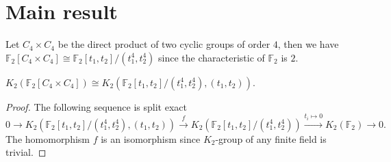 \section{Main result}
Let $C_4\times C_4$ be the direct product of two cyclic groups of order $4$, then we have $\mathbb{F}_2[C_4\times C_4]  \cong \mathbb{F}_2[t_1,t_2]/(t_1^4,t_2^4)$ since the characteristic of $\mathbb{F}_2$ is $2$.
\begin{lemma}
	$K_2(\mathbb{F}_2[C_4\times C_4] ) \cong K_2(\mathbb{F}_2[t_1,t_2]/(t_1^4,t_2^4),(t_1,t_2))$.
\end{lemma}
\begin{proof}
	The following sequence is split exact
	\[
	0\longrightarrow K_2(\mathbb{F}_2[t_1,t_2]/(t_1^4,t_2^4),(t_1,t_2)) \overset{f}\longrightarrow K_2(\mathbb{F}_2[t_1,t_2]/(t_1^4,t_2^4)) \overset{t_i\mapsto 0}\longrightarrow K_2(\mathbb{F}_2) \longrightarrow 0.
	\]
	The homomorphism $f$ is an isomorphism since $K_2$-group of any finite field is trivial.
\end{proof}

